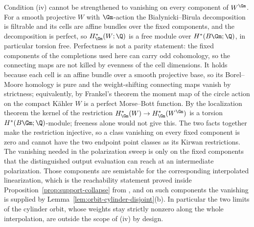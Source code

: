 \begin{remark}
\label{rem:iv-semistable-restriction}
Condition \textup{(iv)} cannot be strengthened to vanishing on every
component of \(W^{\Gm}\).  For a smooth projective \(W\) with \(\Gm\)-action
the Bia{\l}ynicki--Birula decomposition is filtrable and its cells are affine
bundles over the fixed components, and the decomposition is perfect, so
\(H^*_{\Gm}(W;\Q)\) is a free module over
\(H^*(B\Gm;\Q)\), in particular torsion free.  Perfectness is not a parity
statement: the fixed components of the completions used here can carry odd
cohomology, so the connecting maps are not killed by evenness of the cell
dimensions.  It holds because each cell is an affine bundle over a smooth
projective base, so its Borel--Moore homology is pure and the weight-shifting
connecting maps vanish by strictness; equivalently, by Frankel's theorem the
moment map of the circle action on the compact K\"ahler \(W\) is a perfect
Morse--Bott function.  By the localization theorem the
kernel of the restriction
\(H^*_{\Gm}(W)\to H^*_{\Gm}(W^{\Gm})\) is a torsion \(H^*(B\Gm;\Q)\)-module;
freeness alone would not give this.  The two facts together make the
restriction injective, so a class vanishing on
every fixed component is zero and cannot have the two endpoint
point classes as its Kirwan restrictions.  The vanishing needed in the
polarization sweep is only on the fixed components that the distinguished
output evaluation can reach at an intermediate polarization.  Those components
are semistable for the corresponding interpolated linearization, which is the
reachability statement proved inside
Proposition~\ref{prop:support-collapse} from
\cite[Lemma~3.17]{GonzalezWoodward}, and on such components the vanishing is
supplied by Lemma~\ref{lem:orbit-cylinder-disjoint}\textup{(b)}.  In particular
the two limits of the cylinder orbit, whose weights stay strictly nonzero
along the whole interpolation, are outside the scope of \textup{(iv)} by
design.
\end{remark}

